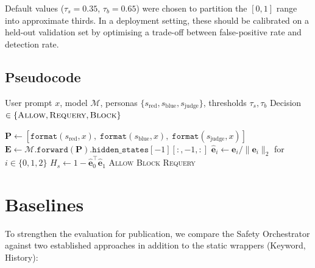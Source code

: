 \documentclass[12pt,a4paper]{article}
\begin{document}
Default values ($\tau_s = 0.35$, $\tau_b = 0.65$) were chosen to
partition the $[0,1]$ range into approximate thirds.  In a deployment
setting, these should be calibrated on a held-out validation set by
optimising a trade-off between false-positive rate and detection rate.

\subsection{Pseudocode}
\label{sec:entropy:pseudocode}

\begin{algorithm}[htbp]
\caption{Parallel Safety Orchestrator --- single prompt evaluation}
\label{alg:orchestrator}
\begin{algorithmic}[1]
\Require User prompt $x$, model $\mathcal{M}$, personas
         $\{s_{\text{red}}, s_{\text{blue}}, s_{\text{judge}}\}$,
         thresholds $\tau_s, \tau_b$
\Ensure  Decision $\in \{\textsc{Allow}, \textsc{Requery}, \textsc{Block}\}$

\State $\mathbf{P} \gets [\texttt{format}(s_{\text{red}}, x),\;
                           \texttt{format}(s_{\text{blue}}, x),\;
                           \texttt{format}(s_{\text{judge}}, x)]$
\State $\mathbf{E} \gets \mathcal{M}.\texttt{forward}(\mathbf{P}).\texttt{hidden\_states}[-1][:, -1, :]$
\State $\hat{\mathbf{e}}_i \gets \mathbf{e}_i / \|\mathbf{e}_i\|_2$
       for $i \in \{0,1,2\}$
\State $H_s \gets 1 - \hat{\mathbf{e}}_0^{\top} \hat{\mathbf{e}}_1$
    \Return \textsc{Allow}
    \Return \textsc{Block}
\Else
    \Return \textsc{Requery}
\EndIf
\end{algorithmic}
\end{algorithm}


\section{Baselines}
\label{sec:baselines}

To strengthen the evaluation for publication, we compare the Safety
Orchestrator against two established approaches in addition to the
static wrappers (Keyword, History):
\end{document}
